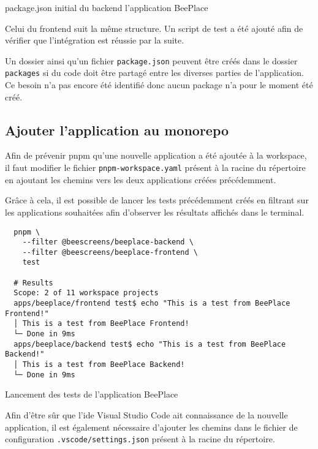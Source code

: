 \begin{listing}[h]
  \inputminted[tabsize=4, linenos]{json}{assets/figures/package.json}
  \caption{package.json initial du backend l'application BeePlace}
  \label{listing:beeplace-backend-package-json}
\end{listing}

Celui du frontend suit la même structure. Un script de test a été ajouté afin de vérifier que l'intégration est réussie par la suite.

Un dossier ainsi qu'un fichier \texttt{package.json} peuvent être créés dans le dossier \texttt{packages} si du code doit être partagé entre les diverses parties de l'application. Ce besoin n'a pas encore été identifié donc aucun package n'a pour le moment été créé.

\subsection{Ajouter l'application au monorepo}

Afin de prévenir \gls{pnpm} qu'une nouvelle application a été ajoutée à la workspace, il faut modifier le fichier \texttt{pnpm-workspace.yaml} présent à la racine du répertoire en ajoutant les chemins vers les deux applications créées précédemment.


Grâce à cela, il est possible de lancer les tests précédemment créés en filtrant sur les applications souhaitées afin d'observer les résultats affichés dans le terminal.

\begin{listing}[h]
  \begin{verbatim}
  pnpm \
    --filter @beescreens/beeplace-backend \
    --filter @beescreens/beeplace-frontend \
    test

  # Results
  Scope: 2 of 11 workspace projects
  apps/beeplace/frontend test$ echo "This is a test from BeePlace Frontend!"
  │ This is a test from BeePlace Frontend!
  └─ Done in 9ms
  apps/beeplace/backend test$ echo "This is a test from BeePlace Backend!"
  │ This is a test from BeePlace Backend!
  └─ Done in 9ms
\end{verbatim}
  \caption{Lancement des tests de l'application BeePlace}
  \label{listing:beeplace-tests}
\end{listing}

Afin d'être sûr que l'\gls{ide} Visual Studio Code ait connaissance de la nouvelle application, il est également nécessaire d'ajouter les chemins dans le fichier de configuration \texttt{.vscode/settings.json} présent à la racine du répertoire.

